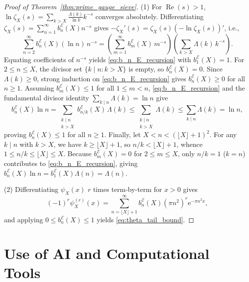 \documentclass[11pt,reqno]{amsart}
\theoremstyle{definition}
\theoremstyle{remark}
\numberwithin{equation}{section}
\newcommand{\ee}{\mathrm{e}}
\newcommand{\Rea}{\operatorname{Re}}
\begin{document}
\begin{proof}[Proof of Theorem~\ref{thm:prime_gauge_sieve}]
(1) For $\Rea(s) > 1$, $\ln\zeta_X(s) = \sum_{k > X}\frac{\Lambda(k)}{\ln k}k^{-s}$ converges absolutely. Differentiating $\zeta_X(s) = \sum_{n=1}^\infty b_n^{\mathcal{E}}(X)n^{-s}$ gives $-\zeta_X'(s) = \zeta_X(s)(-\ln\zeta_X(s))'$, i.e.,
\begin{equation*}
  \sum_{n=2}^{\infty} b_n^{\mathcal{E}}(X)(\ln n)\,n^{-s}
  = \left(\sum_{m=1}^{\infty} b_m^{\mathcal{E}}(X)\,m^{-s}\right)\left(\sum_{k > X}\Lambda(k)\,k^{-s}\right).
\end{equation*}
Equating coefficients of $n^{-s}$ yields \eqref{eq:b_n_E_recursion} with $b_1^{\mathcal{E}}(X) = 1$. For $2 \le n \le X$, the divisor set $\{k \mid n : k > X\}$ is empty, so $b_n^{\mathcal{E}}(X) = 0$. Since $\Lambda(k) \ge 0$, strong induction on \eqref{eq:b_n_E_recursion} gives $b_n^{\mathcal{E}}(X) \ge 0$ for all $n \ge 1$. Assuming $b_m^{\mathcal{E}}(X) \le 1$ for all $1 \le m < n$, \eqref{eq:b_n_E_recursion} and the fundamental divisor identity $\sum_{k \mid n}\Lambda(k) = \ln n$ give
\begin{equation*}
  b_n^{\mathcal{E}}(X)\ln n = \sum_{\substack{k \mid n \\ k > X}} b_{n/k}^{\mathcal{E}}(X)\,\Lambda(k)
  \le \sum_{\substack{k \mid n \\ k > X}}\Lambda(k) \le \sum_{k \mid n}\Lambda(k) = \ln n,
\end{equation*}
proving $b_n^{\mathcal{E}}(X) \le 1$ for all $n \ge 1$. Finally, let $X < n < (\lfloor X\rfloor + 1)^2$. For any $k \mid n$ with $k > X$, we have $k \ge \lfloor X\rfloor + 1$, so $n/k < \lfloor X\rfloor + 1$, whence $1 \le n/k \le \lfloor X\rfloor \le X$. Because $b_m^{\mathcal{E}}(X) = 0$ for $2 \le m \le X$, only $n/k = 1$ ($k = n$) contributes to \eqref{eq:b_n_E_recursion}, giving $b_n^{\mathcal{E}}(X)\ln n = b_1^{\mathcal{E}}(X)\Lambda(n) = \Lambda(n)$.

(2) Differentiating $\psi_X(x)$ $r$ times term-by-term for $x > 0$ gives
\begin{equation*}
  (-1)^r\psi_X^{(r)}(x) = \sum_{n=\lfloor X\rfloor+1}^{\infty} b_n^{\mathcal{E}}(X)(\pi n^2)^r\ee^{-\pi n^2 x},
\end{equation*}
and applying $0 \le b_n^{\mathcal{E}}(X) \le 1$ yields \eqref{eq:theta_tail_bound}.
\end{proof}

\section*{Use of AI and Computational Tools}
\end{document}
